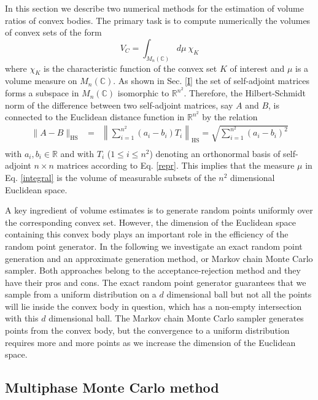 \documentclass[12pt]{iopart}
\begin{document}
In this section we describe two numerical methods for the estimation of volume ratios of convex bodies. The primary task is 
to compute numerically the volumes of convex sets of the form
\begin{equation}
 V_C=\int_{M_n(\mathbb{C})}d \mu~ \chi_K  \label{integral}
\end{equation}
where $\chi_K$ is the characteristic function of the convex set $K$ of interest and $\mu$ is a volume measure on $M_n(\mathbb{C})$. 
As shown
in Sec. \ref{I} the set of self-adjoint matrices forms a subspace
in $M_n(\mathbb{C})$ isomorphic to $\mathbb{R}^{n^2}$. Therefore, the Hilbert-Schmidt norm of the difference between
two self-adjoint matrices, say $A$ and $B$, is connected to the Euclidean distance function in $\mathbb{R}^{n^2}$ by the relation
\begin{eqnarray}
 \|A-B\|_{{\text{HS}}}&=&\left\|\sum_{i=1}^{n^2} (a_i - b_i) T_i\right\|_{{\text{HS}}} = \sqrt{\sum_{i=1}^{n^2} (a_i-b_i)^2}\nonumber
 \\
\end{eqnarray}
with $a_i,b_i \in \mathbb{R}$ and with $T_i$ ($1\leq i\leq n^2$) denoting an orthonormal basis of self-adjoint $n\times n$ matrices according to Eq. \eqref{repr}.
This implies that the measure $\mu$ in Eq. \eqref{integral}
is the volume of measurable subsets of the $n^2$ dimensional Euclidean space. 

A key ingredient of volume estimates is to generate random points uniformly over the corresponding convex set. However, the dimension of the Euclidean space containing this convex body plays an 
important role in the efficiency of the random point generator. In the following we investigate an exact random point generation and an approximate generation method, 
or Markov chain Monte Carlo sampler. Both approaches belong to the acceptance-rejection method and they have their pros and cons. The exact random point generator guarantees that we sample from a uniform 
distribution on a $d$ dimensional ball but not all the points will lie inside the convex body in question, which has a non-empty intersection with this $d$ dimensional ball.
The Markov chain Monte Carlo sampler 
generates points from the convex body, but the convergence to a uniform distribution requires more and more points as we increase the dimension of the Euclidean space.


\subsection{Multiphase Monte Carlo method}
\end{document}
